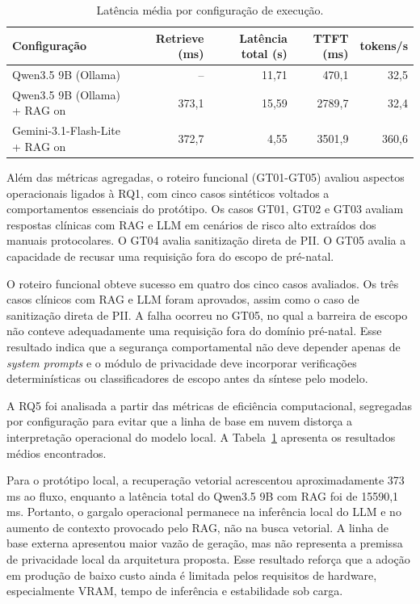 \begin{table}[h!]
  \centering
  \caption{Latência média por configuração de execução.}
  \label{tab:latencia_config}
  \begin{tabular}{lrrrr}
    \toprule
    \textbf{Configuração} 		& \textbf{Retrieve (ms)} 	& \textbf{Latência total (s)} 	& \textbf{TTFT (ms)} 	& \textbf{tokens/s} \\
    \midrule
    Qwen3.5 9B (Ollama)			& --    		 	& 11,71 			& 470,1  		& 32,5 \\
    Qwen3.5 9B (Ollama)   + RAG on  	& 373,1 			& 15,59 			& 2789,7 		& 32,4 \\
    Gemini-3.1-Flash-Lite + RAG on 	& 372,7 			& 4,55  			& 3501,9 		& 360,6 \\
    \bottomrule
  \end{tabular}
\end{table}

Além das métricas agregadas, o roteiro funcional (GT01-GT05) avaliou aspectos operacionais ligados à RQ1, com cinco casos sintéticos voltados a comportamentos essenciais do protótipo. Os casos GT01, GT02 e GT03 avaliam respostas clínicas com RAG e LLM em cenários de risco alto extraídos dos manuais protocolares.
O GT04 avalia sanitização direta de PII.
O GT05 avalia a capacidade de recusar uma requisição fora do escopo de pré-natal.

O roteiro funcional obteve sucesso em quatro dos cinco casos avaliados.
Os três casos clínicos com RAG e LLM foram aprovados, assim como o caso de sanitização direta de PII.
A falha ocorreu no GT05, no qual a barreira de escopo não conteve adequadamente uma requisição fora do domínio pré-natal.
Esse resultado indica que a segurança comportamental não deve depender apenas de \textit{system prompts} e o módulo de privacidade deve incorporar verificações determinísticas ou classificadores de escopo antes da síntese pelo modelo.


A RQ5 foi analisada a partir das métricas de eficiência computacional, segregadas por configuração para evitar que a linha de base em nuvem distorça a interpretação operacional do modelo local.
A Tabela~\ref{tab:latencia_config} apresenta os resultados médios encontrados.

Para o protótipo local, a recuperação vetorial acrescentou aproximadamente 373 ms ao fluxo, enquanto a latência total do Qwen3.5 9B com RAG foi de 15590,1 ms.
Portanto, o gargalo operacional permanece na inferência local do LLM e no aumento de contexto provocado pelo RAG, não na busca vetorial.
A linha de base externa apresentou maior vazão de geração, mas não representa a premissa de privacidade local da arquitetura proposta.
Esse resultado reforça que a adoção em produção de baixo custo ainda é limitada pelos requisitos de hardware, especialmente VRAM, tempo de inferência e estabilidade sob carga.
